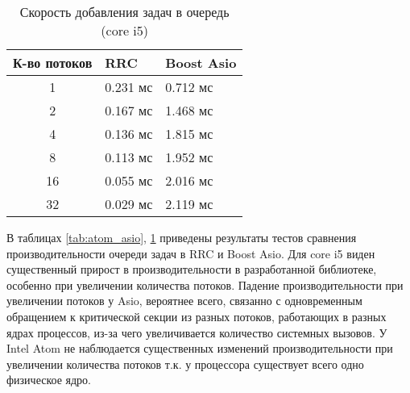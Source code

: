 \begin{table}[!htbp]
    \caption{\label{tab:core_asio}Скорость добавления задач в 
    очередь (core i5)}
    \begin{center}
        \begin{tabularx}{\linewidth}{|c|X|X|}
            \hline
            К-во потоков & RRC & Boost Asio  \\
            \hline
            1 & 0.231 мс & 0.712 мс \\
            \hline
            2 & 0.167 мс & 1.468 мс \\
            \hline
            4 & 0.136 мс & 1.815 мс \\
            \hline
            8 & 0.113 мс & 1.952 мс \\
            \hline
            16 & 0.055 мс & 2.016 мс \\
            \hline
            32 & 0.029 мс & 2.119 мс \\
            \hline
        \end{tabularx}
    \end{center}
\end{table}

В таблицах \ref{tab:atom_asio}, \ref{tab:core_asio} приведены 
результаты тестов сравнения производительности очереди задач в 
RRC и Boost Asio. Для core i5 виден существенный прирост в 
производительности в разработанной библиотеке, особенно при 
увеличении количества потоков. Падение производительности при 
увеличении потоков у Asio, вероятнее всего, связанно с 
одновременным обращением к критической секции из разных потоков, 
работающих в разных ядрах процессов, из-за чего увеличивается 
количество системных вызовов. У Intel Atom не наблюдается 
существенных изменений производительности при увеличении 
количества потоков т.к. у процессора существует всего одно 
физическое ядро.